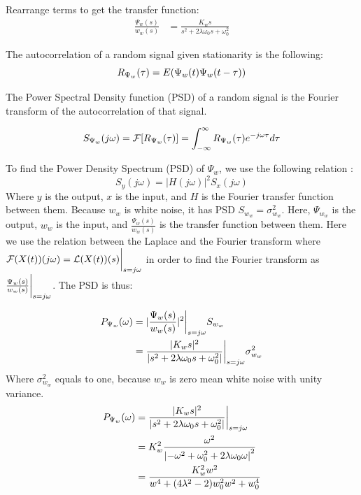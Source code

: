 Rearrange terms to get the transfer function:
\begin{align*}
    \frac{\Psi_w(s)}{w_w(s)} &= \frac{K_ws}{s^2 + 2\lambda\omega_0s + \omega^2_0}
\end{align*}

The autocorrelation of a random signal given stationarity is the following:
\begin{equation*}
R_{\Psi_w}(\tau) = E(\Psi_w(t)\Psi_w(t-\tau))
\end{equation*}

The Power Spectral Density function (PSD) of a random signal is the Fourier transform of the autocorrelation of that signal.

\begin{equation*}
    S_{\Psi_w}(j\omega) = \mathcal{F}[R_{\Psi_w}(\tau)] = \int_{-\infty}^{\infty}R_{\Psi_w}(\tau)e^{-j\omega\tau}d\tau
\end{equation*}

To find the Power Density Spectrum (PSD) of $\Psi_w$, we use the following relation \cite{brown12}:
\begin{equation*}
S_y(j\omega) = |H(j\omega)|^2S_x(j\omega)
\end{equation*}
Where $y$ is the output, $x$ is the input, and $H$ is the Fourier transfer function between them. Because $w_w$ is white noise, it has PSD $S_{w_w} = \sigma_{w_w}^2$. Here, $\Psi_{w_w}$ is the output, $w_w$ is the input, and $\frac{\Psi_w(s)}{w_w(s)}$ is the transfer function between them. Here we use the relation between the Laplace and the Fourier transform where $\mathcal{F}(X(t))(j\omega) = \mathcal{L}(X(t))(s)\bigg{|}_{s=j\omega}$ in order to find the Fourier transform as $\frac{\Psi_w(s)}{w_w(s)}\bigg{|}_{s=j\omega}$. The PSD is thus:

\begin{align*}
P_{\Psi_w}(\omega) &= |\frac{\Psi_w(s)}{w_w(s)}|^2\bigg{|}_{s=j\omega}S_{w_w} \\
&= \frac{|K_ws|^2}{|s^2 + 2\lambda\omega_0s + \omega^2_0|}\bigg{|}_{s=j\omega}\sigma_{w_w}^2
\end{align*}
Where $\sigma_{w_w}^2$ equals to one, because $w_w$ is zero mean white noise with unity variance.
\begin{align*}
    P_{\Psi_w}(\omega) &= \frac{|K_ws|^2}{|s^2 + 2\lambda\omega_0s + \omega^2_0|}\bigg{|}_{s=j\omega} \\ &= K_w^2\frac{\omega^2}{\left|-\omega^2+\omega^2_0+2\lambda\omega_0\omega\right|^2} \\
    &= \frac{K_w^2w^2}{w^4+(4\lambda^2-2)w_0^2w^2+w_0^4}
\end{align*}


